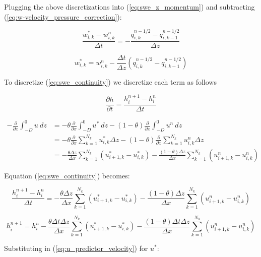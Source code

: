 \documentclass[12pt]{article}
\begin{document}
Plugging the above discretizations into (\ref{eq:swe_z_momentum}) and subtracting (\ref{eq:w-velocity_pressure_correction}):

\begin{equation*}
\frac{w_{i,k}^* - w_{i,k}^n}{\Delta t} = - \frac{q_{i,k}^{n-1/2} - q_{i,k-1}^{n-1/2}}{\Delta z}
\end{equation*}

\begin{equation} \label{eq:w_predictor_velocity}
w_{i,k}^* = w_{i,k}^n - \frac{\Delta t}{\Delta z} (q_{i,k}^{n-1/2} - q_{i,k-1}^{n-1/2})
\end{equation}

To discretize (\ref{eq:swe_continuity}) we discretize each term as follows

\begin{equation*}
\frac{\partial h}{\partial t} = \frac{h_{i}^{n+1} - h_i^n}{\Delta t}
\end{equation*}

\begin{align*}
-\frac{\partial}{\partial x} \int_{-D}^{0} u~ dz &= - \theta  \frac{\partial}{\partial x} \int_{-D}^{0} u^*~ dz - (1-\theta) \frac{\partial}{\partial x} \int_{-D}^{0} u^n~ dz
\\
 &= - \theta  \frac{\partial}{\partial x} \sum_{k=1}^{N_k} u_{i,k}^* \Delta z - (1-\theta) \frac{\partial}{\partial x} \sum_{k=1}^{N_k} u_{i,k}^n \Delta z
\\
 &= - \frac{\theta \Delta z}{\Delta x} \sum_{k=1}^{N_k} (u_{i+1,k}^* - u_{i,k}^*) -  \frac{(1-\theta) \Delta z}{\Delta x} \sum_{k=1}^{N_k} (u_{i+1,k}^n - u_{i,k}^n)
\end{align*}

Equation (\ref{eq:swe_continuity}) becomes:

\begin{equation*}
\frac{h_{i}^{n+1} - h_i^n}{\Delta t} = - \frac{\theta \Delta z}{\Delta x} \sum_{k=1}^{N_k} (u_{i+1,k}^* - u_{i,k}^*) -  \frac{(1-\theta) \Delta z}{\Delta x} \sum_{k=1}^{N_k} (u_{i+1,k}^n - u_{i,k}^n)
\end{equation*}

\begin{equation*}
h_{i}^{n+1} = h_i^n - \frac{\theta \Delta t \Delta z}{\Delta x} \sum_{k=1}^{N_k} (u_{i+1,k}^* - u_{i,k}^*) -  \frac{(1-\theta) \Delta t \Delta z}{\Delta x} \sum_{k=1}^{N_k} (u_{i+1,k}^n - u_{i,k}^n)
\end{equation*}

Substituting in (\ref{eq:u_predictor_velocity}) for $u^*$:
\end{document}
